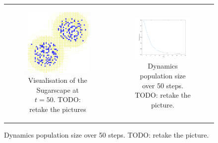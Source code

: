 \begin{figure}
\begin{center}
	\begin{tabular}{c c}
		\begin{subfigure}[b]{0.4\textwidth}
			\centering
			\includegraphics[width=1\textwidth, angle=0]{./fig/sugarscape/vis/sugarscape_t60_environment.png}
			\caption{Visualisation of the Sugarscape at $t = 50$. TODO: retake the pictures}
			\label{fig:vis_sugarscape_t50_environment}
		\end{subfigure}
    	
    	&
  
		\begin{subfigure}[b]{0.6\textwidth}
			\centering
			\includegraphics[width=1\textwidth, angle=0]{./fig/sugarscape/vis/sugarscape_t60_dynamics.png}
			\caption{Dynamics population size over 50 steps. TODO: retake the picture.}
			\label{fig:vis_sugarscape_t50_dynamics}
		\end{subfigure}
	\end{tabular}
	

\end{center}
\end{figure}
